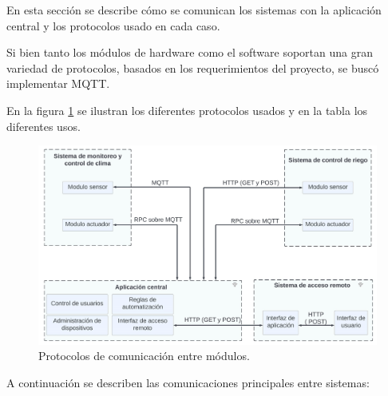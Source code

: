
En esta sección se describe cómo se comunican los sistemas con la aplicación central y los protocolos usado en cada caso.

Si bien tanto los módulos de hardware como el software soportan una gran variedad de protocolos, basados en los requerimientos del proyecto, se buscó implementar MQTT.


En la figura \ref{fig:blockprotos} se ilustran los diferentes protocolos usados y en la tabla los diferentes usos. 

\begin{figure}[h]
	\centering
	\includegraphics[width=1.0\textwidth]{./Figures/blockproto.jpg}
	\caption[Protocolos de comunicación entre módulos.]{Protocolos de comunicación entre módulos.}
	\label{fig:blockprotos}
\end{figure}

 A continuación se describen las comunicaciones principales entre sistemas:
 

